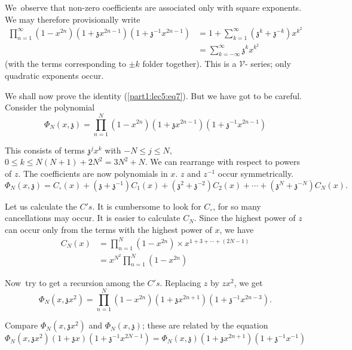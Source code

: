 We\pageoriginale\  observe that non-zero coefficients are associated only with square
exponents. We may therefore provisionally write 
\begin{align*}
  \prod^\infty_{n=1} (1-x^{2n}) (1+ \mathfrak{z}x^{2n-1})(1+
  \mathfrak{z}^{-1} x^{2n-1}) & = 1+ \sum^\infty_{k=1}(\mathfrak{z}^k+
  \mathfrak{z}^{-k}) x^{k^2}\\
  & = \sum^\infty_{k=-\infty} \mathfrak{z}^k x^{k^2} \tag{7}\label{part1:lec5:eq7}
\end{align*}
(with the terms corresponding to $\pm k$ folder together). This is a
$\mathcal{V}$- series; only quadratic exponents occur.

We shall now prove the identity (\ref{part1:lec5:eq7}). But we have got to be
careful. Consider the polynomial
$$
\Phi_N (x, \mathfrak{z}) = \prod^N_{n=1}
(1-x^{2n})(1+\mathfrak{z}x^{2n-1}) (1+\mathfrak{z}^{-1} x^{2n-1})
$$

This consists of terms $\mathfrak{z}^j x^k$ with $-N \leq j \leq N$,
$0 \leq k \leq N (N+1) + 2N^2= 3N^2+N$. We can rearrange with respect
to powers of $z$. The coefficients are now polynomials in $x$. $z$ and
$z^{-1}$ occur symmetrically.
$$
  \Phi_N (x, \mathfrak{z}) = C_\circ (x) +
  (\mathfrak{z}+\mathfrak{z}^{-1}) C_1 (x) + (\mathfrak{z}^2+
  \mathfrak{z}^{-2}) C_2(x)+ \cdots + (\mathfrak{z}^N +
  \mathfrak{z}^{-N}) C_N (x).
$$

Let us calculate the $C's$. It is cumbersome to look for $C_\circ$,
for so many cancellations may occur. It is easier to calculate
$C_N$. Since the highest power of $z$ can occur only from the terms
with the highest power of $x$, we have
\begin{align*}
  C_N (x) & = \prod^N_{n=1} (1-x^{2n}) \times x^{1+3+\cdots + (2N-1)}\\
  & = x^{N^2} \prod^N_{n=1} (1-x^{2n})
\end{align*}

Now\pageoriginale\  try to get a recursion among the $C's$. Replacing $z$ by $zx^2$,
we get
$$
\Phi_N (x, \mathfrak{z}x^2) = \prod^N_{n=1} (1-x^{2n})
(1+\mathfrak{z}x^{2n+1}) (1+\mathfrak{z}^{-1} x^{2n-3}).
$$

Compare $\Phi_N (x, \mathfrak{z}x^2)$ and $\Phi_N (x, \mathfrak{z})$; these are
related by the equation
$$
\Phi_N (x, \mathfrak{z}x^2) (1+\mathfrak{z}x)(1+\mathfrak{z}^{-1}
x^{2N-1}) = \Phi_N (x,
\mathfrak{z})(1+\mathfrak{z}x^{2n+1})(1+\mathfrak{z}^{-1} x^{-1})
$$

